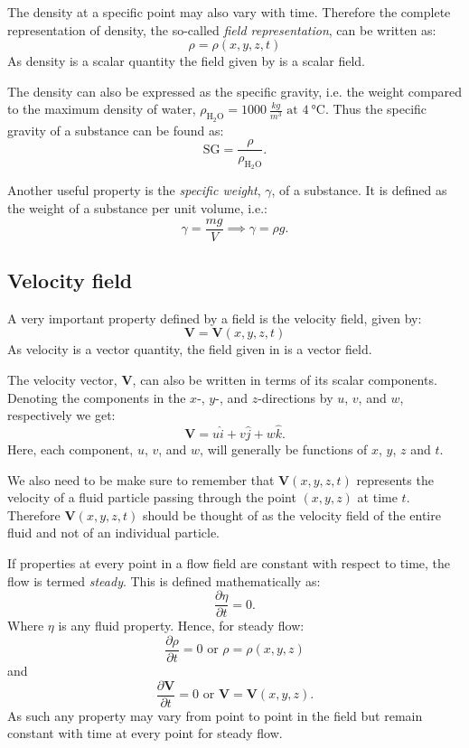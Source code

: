 The density at a specific point may also vary with time. Therefore the complete representation of density, the so-called \textit{field representation}, can be written as:
\begin{equation} \label{eq:dens}
\rho = \rho(x,y,z,t)
\end{equation}
As density is a scalar quantity the field given by  is a scalar field. 

The density can also be expressed as the specific gravity, i.e. the weight compared to the maximum density of water, $\rho_{\mathrm{H}_2 \mathrm{O}} = \qty{1000}{\frac{kg}{m^3}} \text{ at } \qty{4}{\celsius} $. Thus the specific gravity of a substance can be found as:
\[ 
\mathrm{SG} = \frac{\rho}{\rho_{\mathrm{H}_2 \mathrm{O}}}
.\]

Another useful property is the \textit{specific weight}, $\gamma$, of a substance. It is defined as the weight of a substance per unit volume, i.e.:
\[ 
\gamma = \frac{mg}{V} \implies \gamma = \rho g
.\]

\subsection{Velocity field}
A very important property defined by a field is the velocity field, given by:
\begin{equation} \label{eq:velo}
  \textbf{V} = \textbf{V}(x, y, z, t)
\end{equation}
As velocity is a vector quantity, the field given in  is a vector field.

The velocity vector, $\textbf{V}$, can also be written in terms of its scalar components. Denoting the components in the $x$-, $y$-, and $z$-directions by $u$, $v$, and $w$, respectively we get:
\[ 
\textbf{V} = u \hat{i} + v \hat{j} + w \hat{k}
.\]
Here, each component, $u$, $v$, and $w$, will generally be functions of $x$, $y$, $z$ and $t$.

We also need to be make sure to remember that $\textbf{V}(x, y, z, t)$ represents the velocity of a fluid particle passing through the point $(x,y,z)$ at time $t$. Therefore $\textbf{V}(x,y,z,t)$ should be thought of as the velocity field of the entire fluid and not of an individual particle.

If properties at every point in a flow field are constant with respect to time, the flow is termed \textit{steady}. This is defined mathematically as:
\[ 
\frac{\partial \eta}{\partial t} = 0
.\]
Where $\eta$ is any fluid property. Hence, for steady flow:
\[ 
\frac{\partial \rho}{\partial t} = 0 \text{ or } \rho = \rho(x,y,z)
\]
and
\[ 
\frac{\partial \textbf{V}}{\partial t} = 0 \text{ or } \textbf{V} = \textbf{V}(x,y,z)
.\]
As such any property may vary from point to point in the field but remain constant with time at every point for steady flow. 


